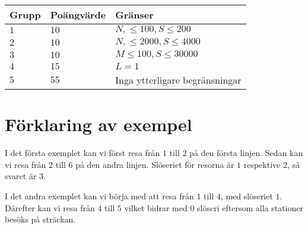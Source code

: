 \noindent
\begin{tabular}{| l | l | l |}
  \hline
  Grupp & Poängvärde & Gränser \\ \hline
  $1$    & $10$        &  $N,\le 100, S \le 200$ \\ \hline
  $2$    & $10$        &  $N,\le 2000, S \le 4000$ \\ \hline
  $3$    & $10$        &  $M \le 100, S \le 30000$ \\ \hline
  $4$    & $15$        &  $L=1$ \\ \hline 
  $5$    & $55$        &  Inga ytterligare begränsningar \\ \hline
\end{tabular}

\section*{Förklaring av exempel}
I det första exemplet kan vi först resa från $1$ till $2$ på den första linjen. Sedan kan vi resa
från $2$ till $6$ på den andra linjen. Slöseriet för resorna är $1$ respektive $2$, så svaret är $3$.

I det andra exemplet kan vi börja med att resa från $1$ till $4$, med slöseriet $1$. Därefter kan vi resa
från $4$ till $5$ vilket bidrar med $0$ slöseri eftersom alla stationer besöks på sträckan.